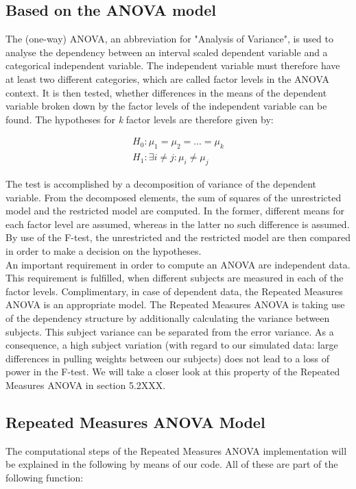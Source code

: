 \documentclass[11pt]{article}
\begin{document}
	\subsection{Based on the ANOVA model}
	The (one-way) ANOVA, an abbreviation for "Analysis of Variance", is used to analyse the dependency between an interval scaled dependent variable and a categorical independent variable. The independent variable must therefore have at least two different categories, which are called factor levels in the ANOVA context. It is then tested, whether differences in the means of the dependent variable broken down by the factor levels of the independent variable can be found. The hypotheses for \textit{k} factor levels are therefore given by:
	
	\begin{eqnarray*}
		H_{0}: {\mu_{1}} = {\mu_{2}} = ... = {\mu_{k}} \\
		H_{1}: \exists i \not= j: {\mu_{i}} \not= {\mu_{j}} 
	\end{eqnarray*} 
	
	The test is accomplished by a decomposition of variance of the dependent variable. From the decomposed elements, the sum of squares of the unrestricted model and the restricted model are computed. In the former, different means for each factor level are assumed, whereas in the latter no such difference is assumed. By use of the F-test, the unrestricted and the restricted model are then compared in order to make a decision on the hypotheses.\\
	
	An important requirement in order to compute an ANOVA are independent data. This requirement is fulfilled, when different subjects are measured in each of the factor levels. Complimentary, in case of dependent data, the Repeated Measures ANOVA is an appropriate model. The Repeated Measures ANOVA is taking use of the dependency structure by additionally calculating the variance between subjects. This subject variance can be separated from the error variance. As a consequence, a high subject variation (with regard to our simulated data: large differences in pulling weights between our subjects) does not lead to a loss of power in the F-test. We will take a closer look at this property of the Repeated Measures ANOVA in section 5.2XXX.
	
	\subsection{Repeated Measures ANOVA Model}
	The computational steps of the Repeated Measures ANOVA implementation will be explained in the following by means of our code. All of these are part of the following function:\\
	
\end{document}
